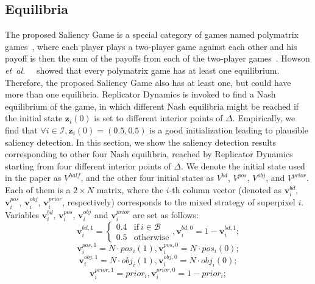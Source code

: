 \documentclass[journal]{IEEEtran}
\newcommand{\etal}{\mbox{\emph{et al.\ }}}
\begin{document}
\subsection{Equilibria}
The proposed Saliency Game is a special category of games named polymatrix games~\cite{Howson1972Equilibria}, where each player plays a two-player game against each other and his payoff is then the sum of the payoffs from each of the two-player games~\cite{Deligkas2016An}. Howson \etal~\cite{Howson1972Equilibria} showed that every polymatrix game has at least one equilibrium. Therefore, the proposed Saliency Game also has at least one, but could have more than one equilibria. Replicator Dynamics is invoked to find a Nash equilibrium of the game, in which different Nash equilibria might be reached if the initial state $\boldsymbol{z}_i(0)$ is set to different interior points of $\Delta$. Empirically, we find that $\forall i \in \mathcal{I}, \boldsymbol{z}_i(0)=(0.5, 0.5)$ is a good initialization leading to plausible saliency detection. In this section, we show the saliency detection results corresponding to other four Nash equilibria, reached by Replicator Dynamics starting from four different interior points of $\Delta$. We denote the initial state used in the paper as $V^{half}$, and the other four initial states as $V^{bd}$, $V^{pos}$, $V^{obj}$, and $V^{prior}$. Each of them is a $2\times N$ matrix, where the $i$-th column vector (denoted as $\boldsymbol{v}_i^{bd}$, $\boldsymbol{v}_i^{pos}$, $\boldsymbol{v}_i^{obj}$, $\boldsymbol{v}_i^{prior}$, respectively) corresponds to the mixed strategy of superpixel $i$. Variables $\boldsymbol{v}_i^{bd}$, $\boldsymbol{v}_i^{pos}$, $\boldsymbol{v}_i^{obj}$ and $\boldsymbol{v}_i^{prior}$ are set as follows:
\begin{equation}
\boldsymbol{v}_i^{bd,1} = 
\begin{cases}
0.4 &\mbox{if}~i \in \mathcal{B}\\
0.5 &\mbox{otherwise}
\end{cases}, 
\boldsymbol{v}_i^{bd,0} = 1-\boldsymbol{v}_i^{bd,1};
\end{equation}
\begin{equation}
\boldsymbol{v}_i^{pos,1} = N \cdot pos_i(1), 
\boldsymbol{v}_i^{pos,0} = N \cdot pos_i(0);
\end{equation}
\begin{equation}
\boldsymbol{v}_i^{obj,1} = N \cdot obj_i(1), 
\boldsymbol{v}_i^{obj,0} = N \cdot obj_i(0);
\end{equation}
\begin{equation}
\boldsymbol{v}_i^{prior,1} = prior_i, 
\boldsymbol{v}_i^{prior,0} = 1-prior_i;
\end{equation}
\end{document}
